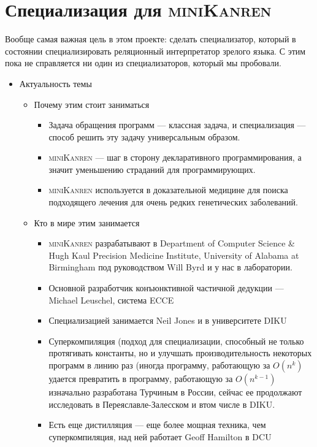 \documentclass{article}
\newcommand{\miniKanren}{\textsc{miniKanren }}
\begin{document}
\section{Специализация для \miniKanren}

Вообще самая важная цель в этом проекте: сделать специализатор, который в состоянии специализировать реляционный интерпретатор зрелого языка. 
С этим пока не справляется ни один из специализаторов, который мы пробовали. 


\begin{itemize}
    \item Актуальность темы
    \begin{itemize}
        \item Почему этим стоит заниматься
        \begin{itemize}
            \item Задача обращения программ --- классная задача, и специализация --- способ решить эту задачу универсальным образом. 
            \item \miniKanren --- шаг в сторону декларативного программирования, а значит уменьшению страданий для программирующих.
            \item \miniKanren используется в доказательной медицине для поиска подходящего лечения для очень редких генетических заболеваний. 
        \end{itemize}
        \item Кто в мире этим занимается
        \begin{itemize}
            \item \miniKanren разрабатывают в Department of Computer Science \& Hugh Kaul Precision Medicine Institute, University of Alabama at Birmingham под руководством Will Byrd и у нас в лаборатории. 
            \item Основной разработчик конъюнктивной частичной дедукции ---  Michael Leuschel, система ECCE
            \item Специализацией занимается Neil Jones и в университете DIKU
            \item Суперкомпиляция (подход для специализации, способный не только протягивать константы, но и улучшать производительность некоторых программ в линию раз (иногда программу, работающую за $O(n^k)$ удается превратить в программу, работающую за $O(n^{k-1})$ изначально разработана Турчиным в России, сейчас ее продолжают исследовать в Переяславле-Залесском и втом числе в DIKU. 
            \item Есть еще дистилляция --- еще более мощная техника,  чем суперкомпиляция, над ней работает Geoff Hamilton в DCU
        

\end{itemize}
\end{itemize}
\end{itemize}
\end{document}
